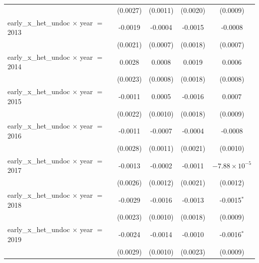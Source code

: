 \begin{tabular}{lcccc}
                                                   & (0.0027)           & (0.0011)                  & (0.0020)               & (0.0009)\\   
   early\_x\_het\_undoc $\times$ year $=$ 2013     & -0.0019            & -0.0004                   & -0.0015                & -0.0008\\   
                                                   & (0.0021)           & (0.0007)                  & (0.0018)               & (0.0007)\\   
   early\_x\_het\_undoc $\times$ year $=$ 2014     & 0.0028             & 0.0008                    & 0.0019                 & 0.0006\\   
                                                   & (0.0023)           & (0.0008)                  & (0.0018)               & (0.0008)\\   
   early\_x\_het\_undoc $\times$ year $=$ 2015     & -0.0011            & 0.0005                    & -0.0016                & 0.0007\\   
                                                   & (0.0022)           & (0.0010)                  & (0.0018)               & (0.0009)\\   
   early\_x\_het\_undoc $\times$ year $=$ 2016     & -0.0011            & -0.0007                   & -0.0004                & -0.0008\\   
                                                   & (0.0028)           & (0.0011)                  & (0.0021)               & (0.0010)\\   
   early\_x\_het\_undoc $\times$ year $=$ 2017     & -0.0013            & -0.0002                   & -0.0011                & $-7.88\times 10^{-5}$\\    
                                                   & (0.0026)           & (0.0012)                  & (0.0021)               & (0.0012)\\   
   early\_x\_het\_undoc $\times$ year $=$ 2018     & -0.0029            & -0.0016                   & -0.0013                & -0.0015$^{*}$\\   
                                                   & (0.0023)           & (0.0010)                  & (0.0018)               & (0.0009)\\   
   early\_x\_het\_undoc $\times$ year $=$ 2019     & -0.0024            & -0.0014                   & -0.0010                & -0.0016$^{*}$\\   
                                                   & (0.0029)           & (0.0010)                  & (0.0023)               & (0.0009)\\   

\end{tabular}
